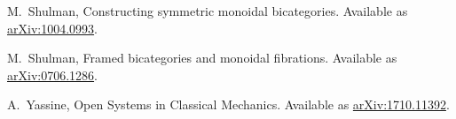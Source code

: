 \documentclass{amsart}
\begin{document}
\begin{thebibliography}{100}






 M.\ Shulman, Constructing symmetric monoidal bicategories. Available as \href{http://arxiv.org/abs/1004.0993}{arXiv:1004.0993}.

 M.\ Shulman, Framed bicategories and monoidal fibrations. Available as \href{https://arxiv.org/abs/0706.1286}{arXiv:0706.1286}.


 A.\ Yassine, Open Systems in Classical Mechanics. Available as \href{https://arxiv.org/abs/1710.11392}{arXiv:1710.11392}.

\end{thebibliography}
\end{document}

